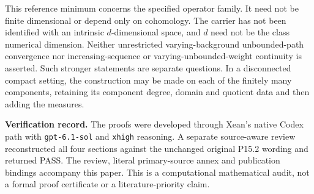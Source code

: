 \documentclass[
  11pt,
]{article}
\begin{document}
This reference minimum concerns the specified operator family. It need
not be finite dimensional or depend only on cohomology. The carrier
has not been identified with an intrinsic \(d\)-dimensional space, and
\(d\) need not be the class numerical dimension. Neither unrestricted
varying-background unbounded-path convergence nor increasing-sequence
or varying-unbounded-weight continuity is asserted. Such stronger
statements are separate questions. In a disconnected compact setting,
the construction may be made on each of the finitely many components,
retaining its component degree, domain and quotient data and then adding
the measures.

\textbf{Verification record.} The proofs were developed through Xean's
native Codex path with \texttt{gpt-6.1-sol} and \texttt{xhigh} reasoning.
A separate source-aware review reconstructed all four sections against
the unchanged original P15.2 wording and returned PASS. The review,
literal primary-source annex and publication bindings accompany this
paper. This is a computational mathematical audit, not a formal proof
certificate or a literature-priority claim.
\end{document}
